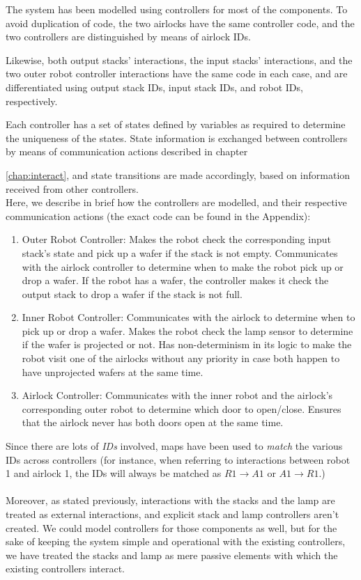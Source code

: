 The system has been modelled using controllers for most of the components. To avoid duplication of code, the two airlocks have the same controller code, and the two controllers are distinguished by means of airlock IDs.

Likewise, both output stacks' interactions, the input stacks' interactions, and the two outer robot controller interactions have the same code in each case, and are differentiated using output stack IDs, input stack IDs, and robot IDs, respectively.

Each controller has a set of states defined by variables as required to determine the uniqueness of the states. State information is exchanged between controllers by means of communication actions described in chapter~{\ref{chap:interact}, and state transitions are made accordingly, based on information received from other controllers.
\\
Here, we describe in brief how the controllers are modelled, and their respective communication actions (the exact code can be found in the Appendix):
\begin{enumerate}
    \item Outer Robot Controller: Makes the robot check the corresponding input stack's state and pick up a wafer if the stack is not empty. Communicates with the airlock controller to determine when to make the robot pick up or drop a wafer. If the robot has a wafer, the controller makes it check the output stack to drop a wafer if the stack is not full. 
    \item Inner Robot Controller: Communicates with the airlock to determine when to pick up or drop a wafer. Makes the robot check the lamp sensor to determine if the wafer is projected or not. Has non-determinism in its logic to make the robot visit one of the airlocks without any priority in case both happen to have unprojected wafers at the same time.
    \item Airlock Controller: Communicates with the inner robot and the airlock's corresponding outer robot to determine which door to open/close. Ensures that the airlock never has both doors open at the same time.
\end{enumerate}

Since there are lots of \textit{IDs} involved, maps have been used to \textit{match} the various IDs across controllers (for instance, when referring to interactions between robot 1 and airlock 1, the IDs will always be matched as $R1 \rightarrow A1$ or $A1 \rightarrow R1$.)
\\\\
Moreover, as stated previously, interactions with the stacks and the lamp are treated as external interactions, and explicit stack and lamp controllers aren't created. We could model controllers for those components as well, but for the sake of keeping the system simple and operational with the existing controllers, we have treated the stacks and lamp as mere passive elements with which the existing controllers interact.

}
